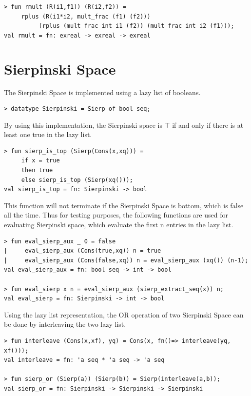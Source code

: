 \documentclass[12pt,twoside,notitlepage]{report}
\begin{document}
{
\begin{verbatim}
> fun rmult (R(i1,f1)) (R(i2,f2)) = 
     rplus (R(i1*i2, mult_frac (f1) (f2))) 
          (rplus (mult_frac_int i1 (f2)) (mult_frac_int i2 (f1)));
val rmult = fn: exreal -> exreal -> exreal
\end{verbatim}
}




\section{Sierpinski Space}
The Sierpinski Space is implemented using a lazy list of booleans.
{
\begin{verbatim}
> datatype Sierpinski = Sierp of bool seq;
\end{verbatim}
}

By using this implementation, the Sierpinski space is $\top$ if and only if there is at least one true in the lazy list. 

{
\begin{verbatim}
> fun sierp_is_top (Sierp(Cons(x,xq))) = 
     if x = true 
     then true 
     else sierp_is_top (Sierp(xq()));
val sierp_is_top = fn: Sierpinski -> bool
\end{verbatim}
}

This function will not terminate if the Sierpinski Space is bottom, which is false all the time. Thus for testing purposes, the following functions are used for evaluating Sierpinski space, which evaluate the first n entries in the lazy list.

{
\begin{verbatim}
> fun eval_sierp_aux _ 0 = false 
|     eval_sierp_aux (Cons(true,xq)) n = true
|     eval_sierp_aux (Cons(false,xq)) n = eval_sierp_aux (xq()) (n-1);
val eval_sierp_aux = fn: bool seq -> int -> bool

> fun eval_sierp x n = eval_sierp_aux (sierp_extract_seq(x)) n;
val eval_sierp = fn: Sierpinski -> int -> bool
\end{verbatim}
}

Using the lazy list representation, the OR operation of two Sierpinski Space can be done by interleaving the two lazy list.

{
\begin{verbatim}
> fun interleave (Cons(x,xf), yq) = Cons(x, fn()=> interleave(yq, xf()));
val interleave = fn: 'a seq * 'a seq -> 'a seq

> fun sierp_or (Sierp(a)) (Sierp(b)) = Sierp(interleave(a,b));
val sierp_or = fn: Sierpinski -> Sierpinski -> Sierpinski
\end{verbatim}
}
\end{document}
